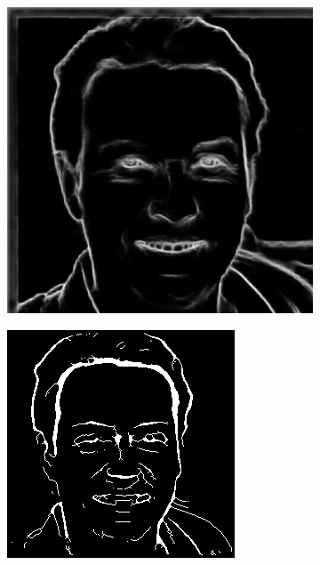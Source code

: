 \documentclass{70_styles/svproc}
\begin{document}
\begin{figure}
\begin{subfigure}[b]{0.2\textwidth}
     \end{subfigure}
     \begin{subfigure}[b]{0.2\textwidth}
         \centering
         \includegraphics[width=\textwidth]{70_figures/HED_seed0039.png}
     \end{subfigure}
     \begin{subfigure}[b]{0.2\textwidth}
         \centering
         \includegraphics[width=\textwidth]{70_figures/seed0039_EM.png}

\end{subfigure}
\end{figure}
\end{document}
